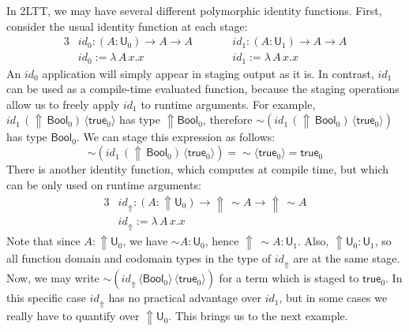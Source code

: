 \documentclass[acmsmall,anonymous,review]{acmart}
\newcommand{\mit}[1]{\mathit{#1}}
\newcommand{\msf}[1]{\mathsf{#1}}
\newcommand{\Lift}{{\Uparrow}}
\newcommand{\spl}{{\sim}}
\newcommand{\qut}[1]{\langle #1\rangle}
\renewcommand{\U}{\msf{U}}
\newcommand{\Bool}{\msf{Bool}}
\newcommand{\true}{\msf{true}}
\theoremstyle{remark}
\begin{document}
In 2LTT, we may have several different polymorphic identity functions. First,
consider the usual identity function at each stage:
\begin{alignat*}{3}
  & \mit{id}_0 : (A : \U_0) \to A \to A\hspace{2em} && \mit{id}_1 : (A : \U_1) \to A \to A\\
  & \mit{id}_0 := \lambda\,A\,x.x       && \mit{id}_1 := \lambda\,A\,x.x
\end{alignat*}
An $\mit{id}_0$ application will simply appear in staging output as it is. In
contrast, $\mit{id}_1$ can be used as a compile-time evaluated function, because
the staging operations allow us to freely apply $\mit{id}_1$ to runtime
arguments. For example, $\mit{id}_1\,(\Lift\,\Bool_0)\,\qut{\true_0}$ has type
$\Lift \Bool_0$, therefore $\spl(\mit{id}_1\,(\Lift\,\Bool_0)\,\qut{\true_0})$
has type $\Bool_0$. We can stage this expression as follows:
\[
\spl(\mit{id}_1\,(\Lift\,\Bool_0)\,\qut{\true_0}) = \spl\qut{\true_0} = \true_0
\]
There is another identity function, which computes at compile time, but which
can be only used on runtime arguments:
\begin{alignat*}{3}
  & \mit{id_\Lift} : (A : \Lift\U_0) \to \Lift\,\spl A \to \Lift\,\spl A\\
  & \mit{id_\Lift} := \lambda\,A\,x.x
\end{alignat*}
Note that since $A : \Lift\U_0$, we have $\spl A : \U_0$, hence $\Lift\,\spl A
: \U_1$.  Also, $\Lift\U_0 : \U_1$, so all function domain and codomain types in
the type of $\mit{id_\Lift}$ are at the same stage. Now, we may write
$\spl(\mit{id_\Lift}\,\qut{\Bool_0}\,\qut{\true_0})$ for a term which is staged
to $\true_0$. In this specific case $\mit{id_\Lift}$ has no practical advantage
over $\mit{id}_1$, but in some cases we really have to quantify over
$\Lift\U_0$. This brings us to the next example.
\end{document}

